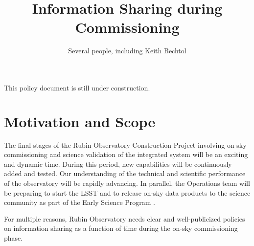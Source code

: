 \documentclass[SE,authoryear,toc,lsstdraft]{lsstdoc}
\title{Information Sharing during Commissioning}
\author{%
Several people, including Keith Bechtol
}
\date{\vcsDate}
\begin{document}
\maketitle


\begin{warning}
  This policy document is still under construction.
\end{warning}

\section{Motivation and Scope}

The final stages of the Rubin Observatory Construction Project involving on-sky commissioning and science validation of the integrated system will be an exciting and dynamic time.
During this period, new capabilities will be continuously added and tested. Our understanding of the technical and scientific performance of the observatory will be rapidly advancing.
In parallel, the Operations team will be preparing to start the LSST and to release on-sky data products to the science community as part of the Early Science Program .

For multiple reasons, Rubin Observatory needs clear and well-publicized policies on information sharing as a function of time during the on-sky commissioning phase.
\end{document}
